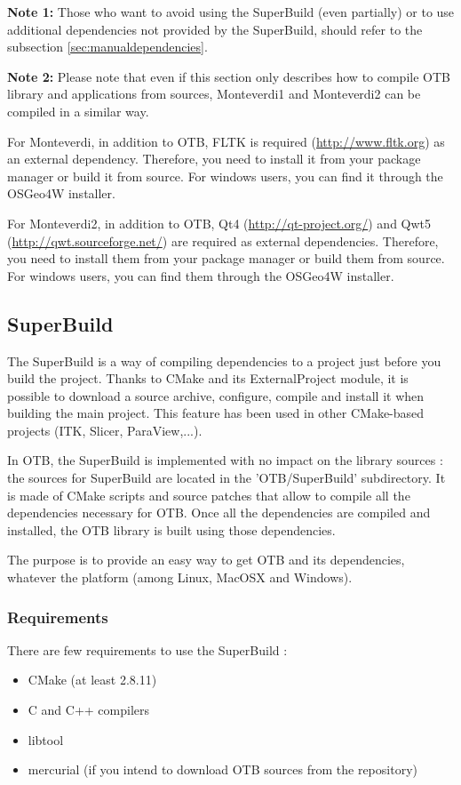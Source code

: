 \textbf{Note 1:} Those who want to avoid using the SuperBuild (even partially) or to use additional dependencies not provided by the SuperBuild, should refer to the subsection \ref{sec:manualdependencies}. 



\textbf{Note 2:} 
Please note that even if this section only describes how to compile OTB library and applications from sources, Monteverdi1 and Monteverdi2 can be compiled in a similar way.

For Monteverdi, in addition to OTB, FLTK is required (\url{http://www.fltk.org}) as an external dependency. Therefore, you need to install it from your package manager or build it from source. For windows users, you can find it through the OSGeo4W installer.

For Monteverdi2, in addition to OTB, Qt4 (\url{http://qt-project.org/}) and Qwt5 (\url{http://qwt.sourceforge.net/}) are required as external dependencies. Therefore, you need to install them from your package manager or build them from source. For windows users, you can find them through the OSGeo4W installer.


\subsection{SuperBuild}
\label{sec:SuperBuild}

The SuperBuild is a way of compiling dependencies to a project just before you build the project. Thanks to CMake and its ExternalProject module, it is possible to download a source archive, configure, compile and install it when building the main project. This feature has been used in other CMake-based projects (ITK, Slicer, ParaView,...).

In OTB, the SuperBuild is implemented with no impact on the library sources : the sources for SuperBuild are located in the 'OTB/SuperBuild' subdirectory. It is made of CMake scripts and source patches that allow to compile all the dependencies necessary for OTB. Once all the dependencies are compiled and installed, the OTB library is built using those dependencies.

The purpose is to provide an easy way to get OTB and its dependencies, whatever the platform (among Linux, MacOSX and Windows). 

\subsubsection{Requirements}
There are few requirements to use the SuperBuild :
\begin{itemize}
	\item CMake (at least 2.8.11)
	\item C and C++ compilers
	\item libtool
	\item mercurial (if you intend to download OTB sources from the repository) 
\end{itemize}

